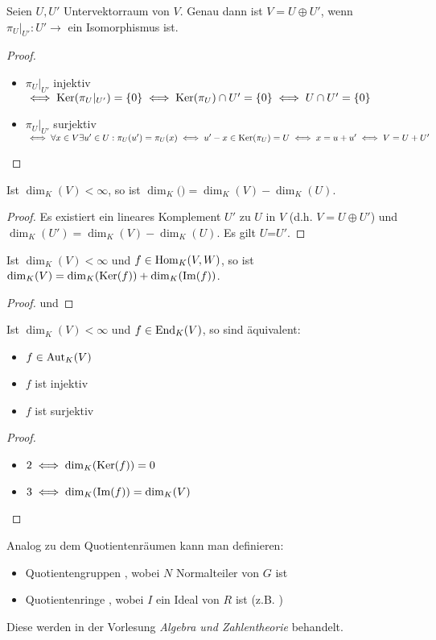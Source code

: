 \begin{proposition}
	Seien $U,U'$ Untervektorraum von $V$. Genau dann ist $V=U\oplus U'$, wenn $\pi_U|_{U'}: U'\to$ ein Isomorphismus 
	ist.
\end{proposition}
\begin{proof}
	\begin{itemize}
		\item $\pi_U|_{U'}$ injektiv $\iff \operatorname{Ker}(\pi_U|_{U'})=\{0\}\iff \operatorname{Ker}(\pi_U)\cap U'=\{0\}\iff U\cap U'=\{0\}$
		\item $\pi_U|_{U'}$ surjektiv $\iff \forall x\in V \exists u'\in U: \pi_U(u')=\pi_U(x)\iff u'-x\in \operatorname{Ker}(\pi_U)=U\iff x=u+u'\iff V=U+U'$
	\end{itemize}
\end{proof}

\begin{conclusion}
	Ist $\dim_K(V)<\infty$, so ist $\dim_K($$)=\dim_K(V)-\dim_K(U)$.
\end{conclusion}
\begin{proof}
	Es existiert ein lineares Komplement $U'$ zu $U$ in $V$ (d.h. $V=U\oplus U'$) und $\dim_K(U')=\dim_K(V)-\dim_K(U)$. Es gilt 
	{$U$}=$U'$.
\end{proof}

\begin{conclusion}
	Ist $\dim_K(V)<\infty$ und $f\in \operatorname{Hom}_K(V,W)$, so ist $\dim_K(V)=\dim_K(\operatorname{Ker}(f))+\dim_K(\operatorname{Im}(f))$.
\end{conclusion}
\begin{proof}
	 und 
\end{proof}

\begin{conclusion}
	Ist $\dim_K(V)<\infty$ und $f\in \operatorname{End}_K(V)$, so sind äquivalent:
	\begin{itemize}
		\item $f\in \operatorname{Aut}_K(V)$
		\item $f$ ist injektiv
		\item $f$ ist surjektiv
	\end{itemize}
\end{conclusion}
\begin{proof}
	\begin{itemize}
		\item $2\iff \dim_K(\operatorname{Ker}(f))=0$
		\item $3\iff \dim_K(\operatorname{Im}(f))=\dim_K(V)$
	\end{itemize}
\end{proof}

\begin{remark}
	Analog zu dem Quotientenräumen kann man definieren:
	\begin{itemize}
		\item Quotientengruppen , wobei $N$ Normalteiler von $G$ ist
		\item Quotientenringe , wobei $I$ ein Ideal von $R$ ist (z.B. )
	\end{itemize}
	Diese werden in der Vorlesung \textit{Algebra und Zahlentheorie} behandelt.
\end{remark}